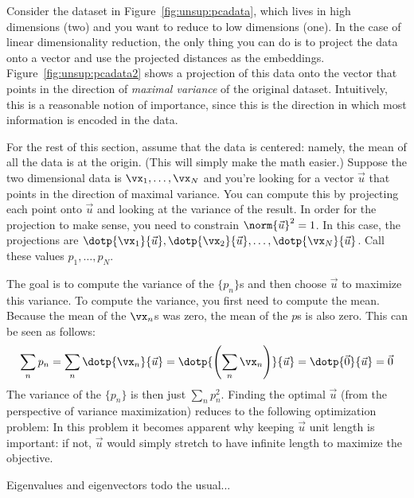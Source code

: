 
Consider the dataset in Figure~\ref{fig:unsup:pcadata}, which lives in
high dimensions (two) and you want to reduce to low dimensions (one).
In the case of linear dimensionality reduction, the only thing you can
do is to project the data onto a vector and use the projected
distances as the embeddings.  Figure~\ref{fig:unsup:pcadata2} shows a
projection of this data onto the vector that points in the direction
of \emph{maximal variance} of the original dataset.  Intuitively, this
is a reasonable notion of importance, since this is the direction in
which most information is encoded in the data.

For the rest of this section, assume that the data is centered:
namely, the mean of all the data is at the origin.  (This will simply
make the math easier.)  Suppose the two dimensional data is $\vx_1,
\dots, \vx_N$ and you're looking for a vector $\vec u$ that points in
the direction of maximal variance.  You can compute this by projecting
each point onto $\vec u$ and looking at the variance of the result.
In order for the projection to make sense, you need to constrain
$\norm{\vec u}^2 = 1$.  In this case, the projections are
$\dotp{\vx_1}{\vec u}, \dotp{\vx_2}{\vec u}, \dots, \dotp{\vx_N}{\vec
  u}$.  Call these values $p_1, \dots, p_N$.

The goal is to compute the variance of the $\{p_n\}$s and then choose
$\vec u$ to maximize this variance.  To compute the variance, you
first need to compute the mean.  Because the mean of the $\vx_n$s was
zero, the mean of the $p$s is also zero.  This can be seen as follows:
%
\begin{align}
  \sum_n p_n
  = \sum_n \dotp{\vx_n}{\vec u}
  = \dotp{\left( \sum_n \vx_n \right)}{\vec u}
  = \dotp{\vec 0}{\vec u} = \vec 0
\end{align}
%
The variance of the $\{p_n\}$ is then just $\sum_n p_n^2$.  Finding
the optimal $\vec u$ (from the perspective of variance maximization)
reduces to the following optimization problem:
%
%
In this problem it becomes apparent why keeping $\vec u$ unit length
is important: if not, $\vec u$ would simply stretch to have infinite
length to maximize the objective.

\begin{mathreview}{Eigenvalues and eigenvectors}
  todo the usual...
\end{mathreview}

